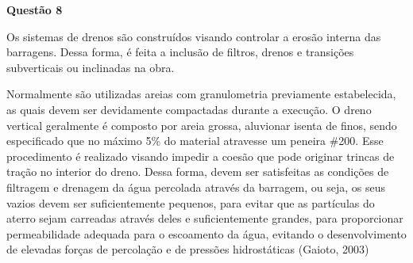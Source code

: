 \item[]\textbf{Questão 8}


\hspace{1cm}Os sistemas de drenos são construídos visando controlar a erosão interna das barragens. Dessa forma, é feita a inclusão de filtros, drenos e transições subverticais ou inclinadas na obra.

\hspace{1cm}Normalmente são utilizadas areias com granulometria previamente estabelecida, as quais devem ser devidamente compactadas durante a execução. O dreno vertical geralmente é composto por areia grossa, aluvionar isenta de finos, sendo especificado que no máximo 5\% do material atravesse um peneira \#200. Esse procedimento é realizado visando impedir a coesão que pode originar trincas de tração no interior do dreno. Dessa forma, devem ser satisfeitas as condições de filtragem e drenagem da água percolada através da barragem, ou seja, os seus vazios devem ser suficientemente pequenos, para evitar que as partículas do aterro sejam carreadas através deles e suficientemente grandes, para proporcionar permeabilidade adequada para o escoamento da água, evitando o desenvolvimento de elevadas forças de percolação e de pressões hidrostáticas (Gaioto, 2003) 